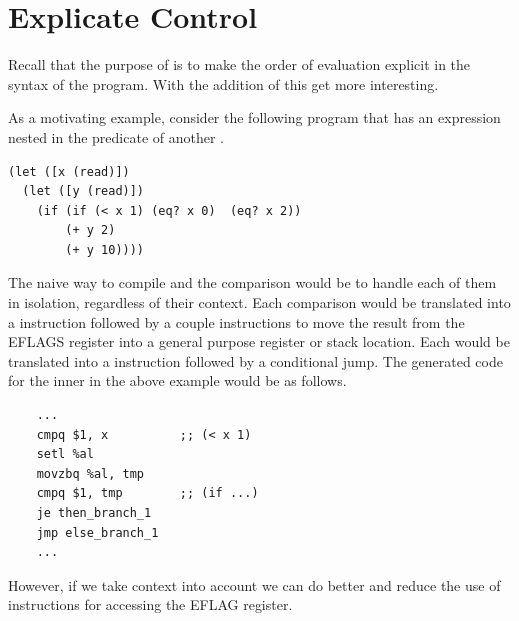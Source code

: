 \documentclass[11pt]{book}
\begin{document}
\section{Explicate Control}
\label{sec:explicate-control-Rif}

Recall that the purpose of  is to make the
order of evaluation explicit in the syntax of the program.  With the
addition of  this get more interesting.

As a motivating example, consider the following program that has an
 expression nested in the predicate of another .
\begin{center}
\begin{minipage}{0.96\textwidth}
\begin{lstlisting}
(let ([x (read)])
  (let ([y (read)])
    (if (if (< x 1) (eq? x 0)  (eq? x 2))
        (+ y 2)
        (+ y 10))))
\end{lstlisting}
\end{minipage}
\end{center}
%
The naive way to compile  and the comparison would be to
handle each of them in isolation, regardless of their context.  Each
comparison would be translated into a  instruction followed
by a couple instructions to move the result from the EFLAGS register
into a general purpose register or stack location. Each  would
be translated into a  instruction followed by a conditional
jump. The generated code for the inner  in the above example
would be as follows.
\begin{center}
\begin{minipage}{0.96\textwidth}
\begin{lstlisting}
    ...
    cmpq $1, x          ;; (< x 1)
    setl %al
    movzbq %al, tmp
    cmpq $1, tmp        ;; (if ...)
    je then_branch_1
    jmp else_branch_1
    ...
\end{lstlisting}
\end{minipage}
\end{center}
However, if we take context into account we can do better and reduce
the use of  instructions for accessing the EFLAG register.
\end{document}
